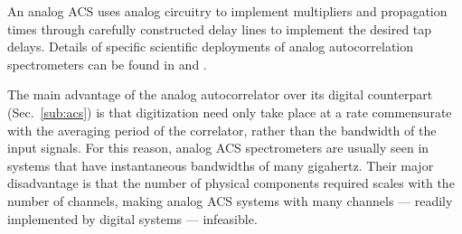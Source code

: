 \documentclass{ws-rv961x669}
\begin{document}





An analog ACS uses analog circuitry to implement multipliers and propagation times through carefully constructed delay lines to implement the desired tap delays. 
Details of specific scientific deployments of analog autocorrelation spectrometers can be found in \cite{Erickson2007} and \cite{Harris1998}.

The main advantage of the analog autocorrelator over its digital counterpart (Sec.~\ref{sub:acs}) is that digitization need only take place at a rate commensurate with the averaging period of the correlator, rather than the bandwidth of the input signals. For this reason, analog ACS spectrometers are usually seen in systems that have instantaneous bandwidths of many gigahertz. Their major disadvantage is that the number of physical components required scales with the number of channels, making analog ACS systems with many channels --- readily implemented by digital systems ---  infeasible.


\end{document}

